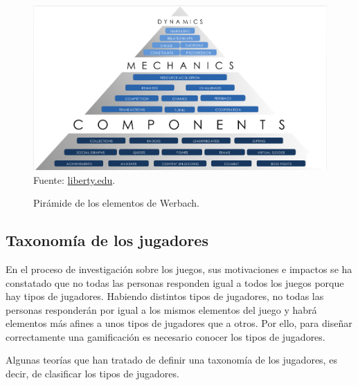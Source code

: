 \begin{figure}[hbt]
\begin{center}
\caption{Pirámide de los elementos de Werbach.}
\label{fig::PiramydWerbach}
\includegraphics[scale=0.90]{img/Pyramid.png}
\vspace{-0.25cm}
\small{Fuente: \href{http://www.liberty.edu/academics/cafe/index.cfm?id=891255&blogpid=32579&pid=9720}{liberty.edu}.}
\end{center}
\end{figure}
\FloatBarrier



\subsection{Taxonomía de los jugadores}
\label{sec:taxonomy}

%
En el proceso de investigación sobre los juegos, sus motivaciones e impactos se ha constatado que no todas las personas responden igual a todos los juegos porque hay tipos de jugadores. 
%
Habiendo distintos tipos de jugadores, no todas las personas responderán por igual a los mismos elementos del juego y habrá elementos más afines a unos tipos de jugadores que a otros. 
%
Por ello, para diseñar correctamente una gamificación es necesario conocer los tipos de jugadores.

Algunas teorías que han tratado de definir una taxonomía de los jugadores, es decir, de clasificar los tipos de jugadores.

